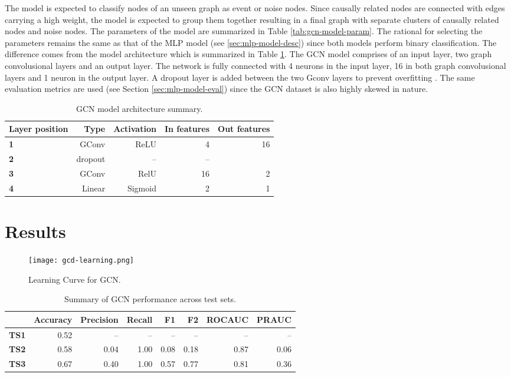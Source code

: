 The model is expected to classify nodes of an unseen graph as event or
noise nodes. Since causally related nodes are connected with edges
carrying a high weight, the model is expected to group them together
resulting in a final graph with separate clusters of causally related
nodes and noise nodes. The parameters of the model are summarized in
Table \ref{tab:gcn-model-param}. The rational for selecting the
parameters remains the same as that of the MLP model (see
\ref{sec:mlp-model-desc}) since both models perform binary
classification. The difference comes from the model architecture which
is summarized in Table \ref{tab:gcn-model-arch}. The GCN model
comprises of an input layer, two graph convolusional layers and an
output layer. The network is fully connected with 4 neurons in the
input layer, 16 in both graph convolusional layers and 1 neuron in the
output layer. A dropout layer is added between the two Gconv layers to
prevent overfitting \cite{srivastava14dropout}. The same evaluation
metrics are used (see Section \ref{sec:mlp-model-eval}) since the GCN
dataset is also highly skewed in nature.

\begin{table}
  \centering
  \caption{GCN model architecture summary.}
  \begin{tabular}{lrrrr}
    \hline
    Layer position & Type & Activation & In features & Out features \\
    \hline
    \textbf{1} & GConv & ReLU & 4 & 16 \\
    \textbf{2} & dropout & -- & -- \\
    \textbf{3} & GConv & RelU & 16 & 2 \\
    \textbf{4} & Linear & Sigmoid & 2 & 1 \\
    \hline
  \end{tabular}
  \label{tab:gcn-model-arch}
\end{table}

\section{Results}
\label{sec:gcd-disc}

\begin{figure}[htb]
  \centering
    \texttt{[image: gcd-learning.png]}
    \caption{Learning Curve for GCN.}
  \label{fig:gcn-learning}
\end{figure}

\begin{table}[htb]
  \centering
  \caption{Summary of GCN performance across test sets.}
  \begin{tabular}{lrrrrrrr}
    \hline
    & Accuracy & Precision & Recall & F1 & F2 & ROCAUC & PRAUC \\
    \hline
    \textbf{TS1} & 0.52 & -- & -- & -- & -- & -- & -- \\
    \textbf{TS2} & 0.58 & 0.04 & 1.00 & 0.08 & 0.18 & 0.87 & 0.06 \\
    \textbf{TS3} & 0.67 & 0.40 & 1.00 & 0.57 & 0.77 & 0.81 & 0.36 \\
    \hline
  \end{tabular}
  \label{tab:gcn-results}
\end{table}

